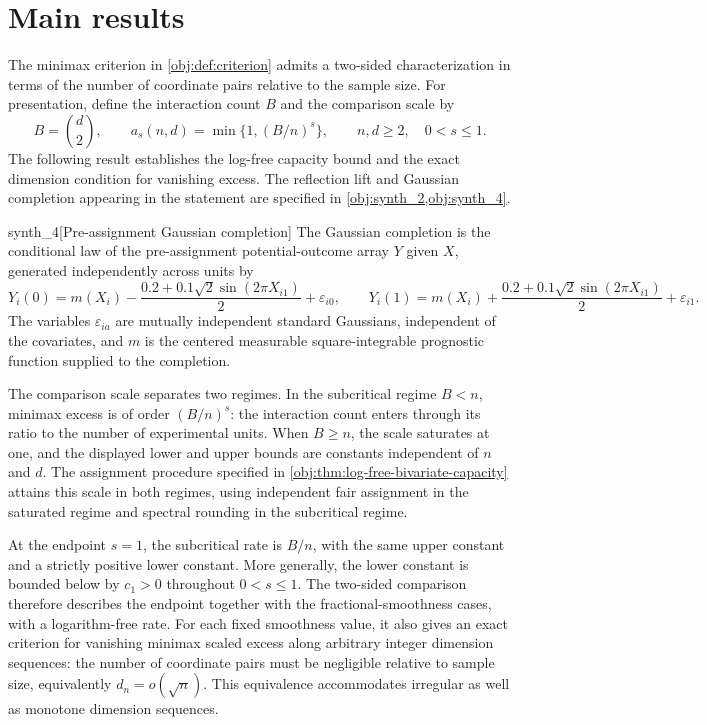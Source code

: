 \section{Main results}

The minimax criterion in \cref{obj:def:criterion} admits a two-sided characterization in terms of the number of coordinate pairs relative to the sample size. For presentation, define the interaction count \(B\) and the comparison scale  by
\[
B=\binom d2,
\qquad
a_s(n,d)=\min\{1,(B/n)^s\},
\qquad n,d\geq2,\quad 0<s\leq1.
\]
The following result establishes the log-free capacity bound and the exact dimension condition for vanishing excess. The reflection lift and Gaussian completion appearing in the statement are specified in \cref{obj:synth_2,obj:synth_4}.

\begin{definitionv}{synth_4}[Pre-assignment Gaussian completion]
The Gaussian completion is the conditional law of the pre-assignment potential-outcome array \(Y\) given \(X\), generated independently across units by
\[
Y_i(0)=m(X_i)-\frac{0.2+0.1\sqrt2\sin(2\pi X_{i1})}{2}+\varepsilon_{i0},
\qquad
Y_i(1)=m(X_i)+\frac{0.2+0.1\sqrt2\sin(2\pi X_{i1})}{2}+\varepsilon_{i1}.
\]
The variables \(\varepsilon_{ia}\) are mutually independent standard Gaussians, independent of the covariates, and \(m\) is the centered measurable square-integrable prognostic function supplied to the completion.
\end{definitionv}

The comparison scale separates two regimes. In the subcritical regime \(B<n\), minimax excess is of order \((B/n)^s\): the interaction count enters through its ratio to the number of experimental units. When \(B\geq n\), the scale saturates at one, and the displayed lower and upper bounds are constants independent of \(n\) and \(d\). The assignment procedure  specified in \cref{obj:thm:log-free-bivariate-capacity} attains this scale in both regimes, using independent fair assignment in the saturated regime and spectral rounding in the subcritical regime.

At the endpoint \(s=1\), the subcritical rate is \(B/n\), with the same upper constant and a strictly positive lower constant. More generally, the lower constant  is bounded below by \(c_1>0\) throughout \(0<s\leq1\). The two-sided comparison therefore describes the endpoint together with the fractional-smoothness cases, with a logarithm-free rate. For each fixed smoothness value, it also gives an exact criterion for vanishing minimax scaled excess along arbitrary integer dimension sequences: the number of coordinate pairs must be negligible relative to sample size, equivalently \(d_n=o(\sqrt n)\). This equivalence accommodates irregular as well as monotone dimension sequences.

